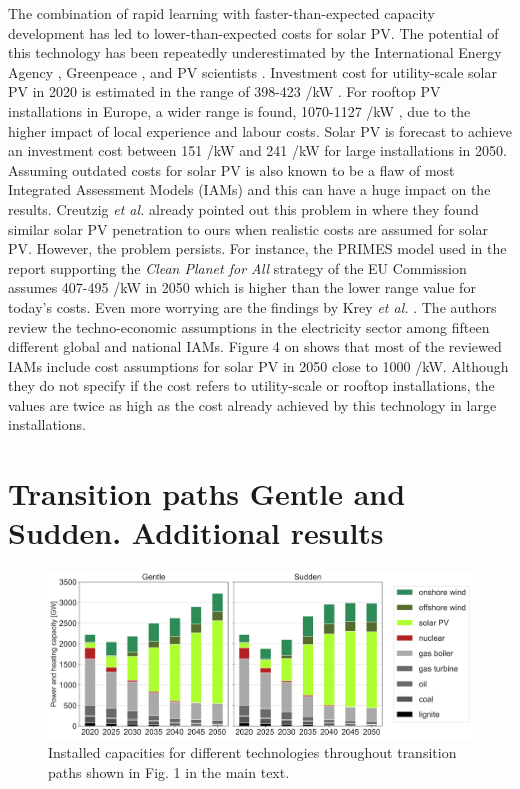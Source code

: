 \documentclass[3p]{elsarticle} %
\begin{document}
The combination of rapid learning with faster-than-expected capacity development has led to lower-than-expected costs for solar PV. The potential of this technology has been repeatedly underestimated by the International Energy Agency \cite{Fell_2015}, Greenpeace \cite{Creutzig_2017}, and PV scientists \cite{Haegel_2019}. Investment cost for utility-scale solar PV in 2020 is estimated in the range of 398-423 \EUR/kW \cite{Vartiainen_2017, DEA_2019}. For rooftop PV installations in Europe, a wider range is found, 1070-1127 \EUR/kW \cite{DEA_2019, Fraunhofer, Vartiainen_2019}, due to the higher impact of local experience and labour costs. Solar PV is forecast to achieve an investment cost between 151 \EUR/kW \cite{Vartiainen_2019} and 241 \EUR/kW  \cite{DEA_2019} for large installations in 2050. \\


Assuming outdated costs for solar PV is also known to be a flaw of most Integrated Assessment Models (IAMs) and this can have a huge impact on the results. Creutzig \textit{et al.} already pointed out this problem in \cite{Creutzig_2017} where they found similar solar PV penetration to ours when realistic costs are assumed for solar PV. However, the problem persists. For instance, the PRIMES model used in the report supporting the \textit{Clean Planet for All} strategy of the EU Commission \cite{in-depth_2018} assumes 407-495 \EUR/kW in 2050 \cite{in-depth-data} which is higher than the lower range value for today's costs. Even more worrying are the findings by Krey \textsl{et al.} \cite{Krey_2019}. The authors review the techno-economic assumptions in the electricity sector among fifteen different global and national IAMs. Figure 4 on \cite{Krey_2019} shows that most of the reviewed IAMs include cost assumptions for solar PV in 2050 close to 1000 \EUR/kW. Although they do not specify if the cost refers to utility-scale or rooftop installations, the values are twice as high as the cost already achieved by this technology in large installations. 

\section{Transition paths Gentle and Sudden. Additional results}

\begin{figure}[!h]
	\centering
	\includegraphics[width=\columnwidth]{figures/installed_capacity_Base.png}
	\caption{Installed capacities for different technologies throughout transition paths shown in Fig. 1 in the main text.} \label{fig_installed_capacity} 
\end{figure}
\end{document}
